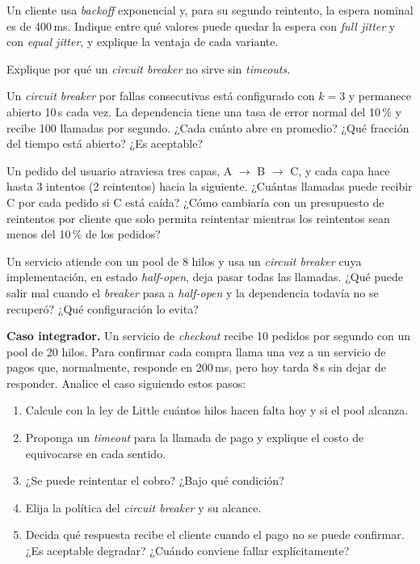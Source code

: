 \documentclass[variant=guia,cover=institutional,mode=screen]{ua-engineering-v6-article}
\begin{document}
\begin{uaexercise}
Un cliente usa \emph{backoff} exponencial y, para su segundo reintento, la espera nominal es de 400\,ms. Indique entre qué valores puede quedar la espera con \emph{full jitter} y con \emph{equal jitter}, y explique la ventaja de cada variante.
\end{uaexercise}

\begin{uaexercise}
Explique por qué un \emph{circuit breaker} no sirve sin \emph{timeouts}.
\end{uaexercise}

\begin{uaexercise}
Un \emph{circuit breaker} por fallas consecutivas está configurado con $k = 3$ y permanece abierto 10\,s cada vez. La dependencia tiene una tasa de error normal del 10\,\% y recibe 100 llamadas por segundo. ¿Cada cuánto abre en promedio? ¿Qué fracción del tiempo está abierto? ¿Es aceptable?
\end{uaexercise}

\begin{uaexercise}
Un pedido del usuario atraviesa tres capas, A $\to$ B $\to$ C, y cada capa hace hasta 3 intentos (2 reintentos) hacia la siguiente. ¿Cuántas llamadas puede recibir C por cada pedido si C está caída? ¿Cómo cambiaría con un presupuesto de reintentos por cliente que solo permita reintentar mientras los reintentos sean menos del 10\,\% de los pedidos?
\end{uaexercise}

\begin{uaexercise}
Un servicio atiende con un pool de 8 hilos y usa un \emph{circuit breaker} cuya implementación, en estado \emph{half-open}, deja pasar todas las llamadas. ¿Qué puede salir mal cuando el \emph{breaker} pasa a \emph{half-open} y la dependencia todavía no se recuperó? ¿Qué configuración lo evita?
\end{uaexercise}

\begin{uaexercise}
\textbf{Caso integrador.} Un servicio de \emph{checkout} recibe 10 pedidos por segundo con un pool de 20 hilos. Para confirmar cada compra llama una vez a un servicio de pagos que, normalmente, responde en 200\,ms, pero hoy tarda 8\,s sin dejar de responder. Analice el caso siguiendo estos pasos:
\begin{enumerate}
\item Calcule con la ley de Little cuántos hilos hacen falta hoy y si el pool alcanza.
\item Proponga un \emph{timeout} para la llamada de pago y explique el costo de equivocarse en cada sentido.
\item ¿Se puede reintentar el cobro? ¿Bajo qué condición?
\item Elija la política del \emph{circuit breaker} y su alcance.
\item Decida qué respuesta recibe el cliente cuando el pago no se puede confirmar. ¿Es aceptable degradar? ¿Cuándo conviene fallar explícitamente?
\end{enumerate}
\end{uaexercise}
\end{document}
